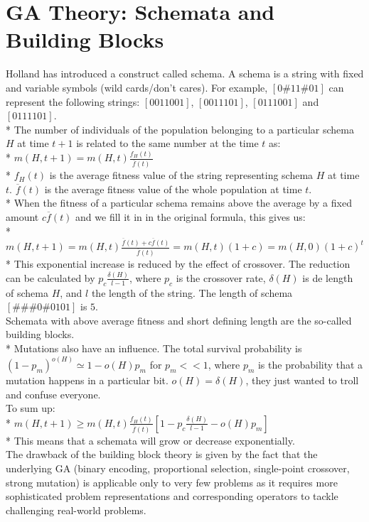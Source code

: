 \documentclass[12pt]{book}
\begin{document}
\section{GA Theory: Schemata and Building Blocks}
Holland has introduced a construct called schema. A schema is a string with fixed and variable symbols (wild cards/don't cares). For example, $[0\#11\#01]$ can represent the following strings: $[0011001]$, $[0011101]$, $[0111001]$ and $[0111101]$.\\*
The number of individuals of the population belonging to a particular schema $H$ at time $t+1$ is related to the same number at the time $t$ as:\\*
$m(H,t+1) = m(H,t)\frac{f_H(t)}{\overline{f}(t)}$\\*
$f_H(t)$ is the average fitness value of the string representing schema $H$ at time $t$. $\overline{f}(t)$ is the average fitness value of the whole population at time $t$.\\*
When the fitness of a particular schema remains above the average by a fixed amount $c\overline{f}(t)$ and we fill it in in the original formula, this gives us:\\*
$m(H,t+1) = m(H,t)\frac{\overline{f}(t) + c\overline{f}(t)}{\overline{f}(t)} = m(H,t)(1 + c) = m(H,0)(1 + c)^t$\\*
This exponential increase is reduced by the effect of crossover. The reduction can be calculated by $p_c\frac{\delta(H)}{l-1}$, where $p_c$ is the crossover rate, $\delta(H)$ is de length of schema $H$, and $l$ the length of the string. The length of schema $[\#\#\#0\#0101]$ is $5$.\\
Schemata with above average fitness and short defining length are the so-called building blocks.\\*
Mutations also have an influence. The total survival probability is $(1-p_m)^{o(H)} \simeq 1-o(H)p_m$ for $p_m << 1$, where $p_m$ is the probability that a mutation happens in a particular bit. $o(H) = \delta(H)$, they just wanted to troll and confuse everyone.\\
To sum up:\\*
$m(H,t+1) \ge m(H,t)\frac{f_H(t)}{\overline{f}(t)}[1-p_c\frac{\delta(H)}{l-1}-o(H)p_m]$\\*
This means that a schemata will grow or decrease exponentially.\\
The drawback of the building block theory is given by the fact that the underlying GA (binary encoding, proportional selection, single-point crossover, strong mutation) is applicable only to very few problems as it requires more sophisticated problem representations and corresponding operators to tackle challenging real-world problems.
\end{document}
